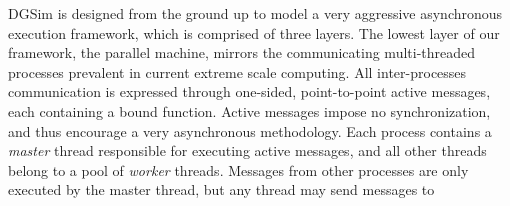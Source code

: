 DGSim is designed from the ground up to model a very aggressive
asynchronous execution framework, which is comprised of three layers.
The lowest layer of our framework, the parallel 
machine, mirrors the communicating multi-threaded processes prevalent 
in current extreme scale computing.
All inter-processes communication is expressed through one-sided,
point-to-point active messages, each containing a bound function.
Active messages impose no synchronization, and thus encourage a very
asynchronous methodology.
Each process contains a {\em master} thread responsible for executing
active messages, and all other threads belong to a pool of {\em worker} threads.
Messages from other processes are only 
executed by the master thread, but any thread may send messages to 
